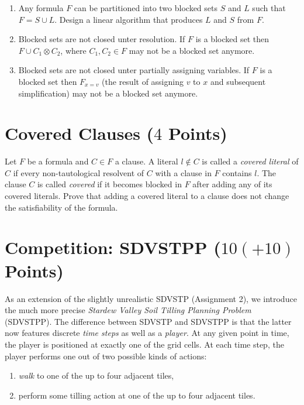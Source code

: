 \documentclass[a4paper]{article}
\begin{document}
\begin{enumerate}\setlength{\itemsep}{1ex}
	\item Any formula $F$ can be partitioned into two blocked sets $S$ and $L$ such that $F = S\cup L$.
    Design a linear algorithm that produces $L$ and $S$ from $F$.
	\item Blocked sets are not closed unter resolution. 
    If $F$ is a blocked set then $F \cup C_1 \otimes C_2$, where $C_1,C_2 \in F$ may not be a blocked set anymore.
	\item Blocked sets are not closed unter partially assigning variables.
    If $F$ is a blocked set then $F_{x=v}$ (the result of assigning $v$ to $x$ and subsequent simplification) may not be a blocked set anymore.
\end{enumerate}


\section{Covered Clauses ($4$ Points)}

Let $F$ be a formula and $C \in F$ a clause. 
A literal $l \not\in C$ is called a \emph{covered literal} of $C$ if every non-tautological resolvent of $C$ with a clause in $F$ contains $l$.
The clause $C$ is called \emph{covered} if it becomes blocked in $F$ after adding any of its covered literals.
Prove that adding a covered literal to a clause does not change the satisfiability of the formula.



\section{Competition: SDVSTPP ($10 (+10)$ Points)}
As an extension of the slightly unrealistic SDVSTP (Assignment 2), we introduce the much more precise \emph{Stardew Valley Soil Tilling Planning Problem} (SDVSTPP).
The difference between SDVSTP and SDVSTPP is that the latter now features discrete \emph{time steps} as well as a \emph{player}.
At any given point in time, the player is positioned at exactly one of the grid cells.
At each time step, the player performs one out of two possible kinds of actions:

\begin{enumerate}\setlength{\itemsep}{1ex}
\item \emph{walk} to one of the up to four adjacent tiles,
\item perform some tilling action at one of the up to four adjacent tiles.
\end{enumerate}
\end{document}
